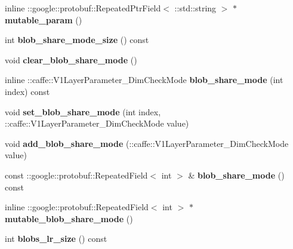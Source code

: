 \begin{DoxyCompactItemize}
inline \+::google\+::protobuf\+::\+Repeated\+Ptr\+Field$<$ \+::std\+::string $>$ $\ast$ {\bfseries mutable\+\_\+param} ()
\item 
\mbox{\label{classcaffe_1_1_v1_layer_parameter_af2e0d410f50c6fd4f5d491d57772af51}} 
int {\bfseries blob\+\_\+share\+\_\+mode\+\_\+size} () const
\item 
\mbox{\label{classcaffe_1_1_v1_layer_parameter_a760c2e548449ac71c13865a3137a4e19}} 
void {\bfseries clear\+\_\+blob\+\_\+share\+\_\+mode} ()
\item 
\mbox{\label{classcaffe_1_1_v1_layer_parameter_a5cc988eea558c1db681044c302f3f3a1}} 
inline \+::caffe\+::\+V1\+Layer\+Parameter\+\_\+\+Dim\+Check\+Mode {\bfseries blob\+\_\+share\+\_\+mode} (int index) const
\item 
\mbox{\label{classcaffe_1_1_v1_layer_parameter_a3534f52b865b9784518e3b538f2a5825}} 
void {\bfseries set\+\_\+blob\+\_\+share\+\_\+mode} (int index, \+::caffe\+::\+V1\+Layer\+Parameter\+\_\+\+Dim\+Check\+Mode value)
\item 
\mbox{\label{classcaffe_1_1_v1_layer_parameter_aced562cfd496006ce778d717acc50a77}} 
void {\bfseries add\+\_\+blob\+\_\+share\+\_\+mode} (\+::caffe\+::\+V1\+Layer\+Parameter\+\_\+\+Dim\+Check\+Mode value)
\item 
\mbox{\label{classcaffe_1_1_v1_layer_parameter_a47c197c00e3f5b6c5a19ed5ab4200dfe}} 
const \+::google\+::protobuf\+::\+Repeated\+Field$<$ int $>$ \& {\bfseries blob\+\_\+share\+\_\+mode} () const
\item 
\mbox{\label{classcaffe_1_1_v1_layer_parameter_add66565fe59efedd71960c9662cf0e28}} 
inline \+::google\+::protobuf\+::\+Repeated\+Field$<$ int $>$ $\ast$ {\bfseries mutable\+\_\+blob\+\_\+share\+\_\+mode} ()
\item 
\mbox{\label{classcaffe_1_1_v1_layer_parameter_a984d196ebf11b225f424c60da8c3177f}} 
int {\bfseries blobs\+\_\+lr\+\_\+size} () const
\item 

\end{DoxyCompactItemize}
